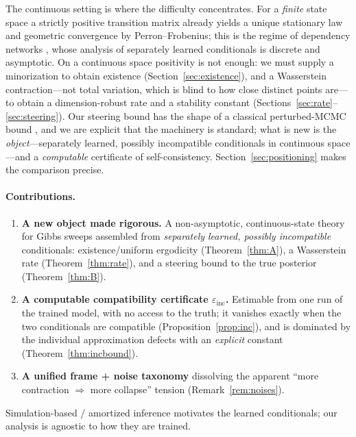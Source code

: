 \documentclass[11pt]{article}
\theoremstyle{plain}
\theoremstyle{definition}
\theoremstyle{remark}
\newcommand{\einc}{\varepsilon_{\mathrm{inc}}}
\begin{document}
The continuous setting is where the difficulty concentrates. For a \emph{finite} state space a
strictly positive transition matrix already yields a unique stationary law and geometric convergence
by Perron--Frobenius; this is the regime of dependency networks \citep{heckerman2000}, whose analysis
of separately learned conditionals is discrete and asymptotic. On a continuous space positivity is not
enough: we must supply a minorization to obtain existence (Section~\ref{sec:existence}), and a
Wasserstein contraction---not total variation, which is blind to how close distinct points are---to
obtain a dimension-robust rate and a stability constant (Sections~\ref{sec:rate}--\ref{sec:steering}).
Our steering bound has the shape of a classical perturbed-MCMC bound
\citep{mitrophanov2005,rudolf2018}, and we are explicit that the machinery is standard; what is new is
the \emph{object}---separately learned, possibly incompatible conditionals in continuous space---and a
\emph{computable} certificate of self-consistency. Section~\ref{sec:positioning} makes the comparison
precise.

\paragraph{Contributions.}
\begin{enumerate}
  \item \textbf{A new object made rigorous.} A non-asymptotic, continuous-state theory for Gibbs
        sweeps assembled from \emph{separately learned, possibly incompatible} conditionals:
        existence/uniform ergodicity (Theorem~\ref{thm:A}), a Wasserstein rate (Theorem~\ref{thm:rate}),
        and a steering bound to the true posterior (Theorem~\ref{thm:B}).
  \item \textbf{A computable compatibility certificate $\einc$.} Estimable from one run of the trained
        model, with no access to the truth; it vanishes exactly when the two conditionals are
        compatible (Proposition~\ref{prop:inc}), and is dominated by the individual approximation
        defects with an \emph{explicit} constant (Theorem~\ref{thm:incbound}).
  \item \textbf{A unified frame + noise taxonomy} dissolving the apparent ``more contraction
        $\Rightarrow$ more collapse'' tension (Remark~\ref{rem:noises}).
\end{enumerate}
Simulation-based / amortized inference \citep{papamakarios2016,cranmer2020} motivates the learned
conditionals; our analysis is agnostic to how they are trained.
\end{document}
